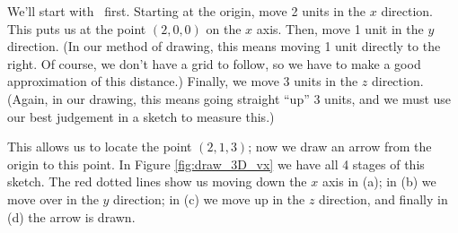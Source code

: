 {We'll start with \vx\ first. Starting at the origin, move 2 units in the $x$ direction. This puts us at the point $(2,0,0)$ on the $x$ axis. Then, move 1 unit in the $y$ direction. (In our method of drawing, this means moving 1 unit directly to the right. Of course, we don't have a grid to follow, so we have to make a good approximation of this distance.) Finally, we move 3 units in the $z$ direction. (Again, in our drawing, this means going straight ``up'' 3 units, and we must use our best judgement in a sketch to measure this.)

This allows us to locate the point $(2,1,3)$; now we draw an arrow from the origin to this point. In Figure \ref{fig:draw_3D_vx} we have all 4 stages of this sketch. The red dotted lines show us moving down the $x$ axis in (a); in (b) we move over in the $y$ direction; in (c) we move up in the $z$ direction, and finally in (d) the arrow is drawn.

\begin{figure}[h!]
\begin{center}
\end{center}
\end{figure}}
